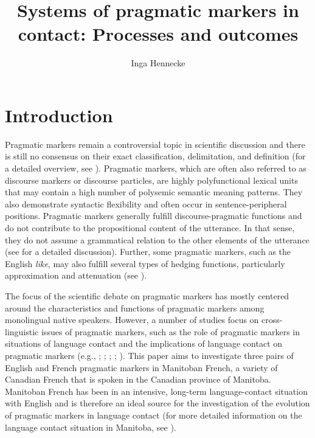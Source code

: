 \documentclass[output=paper]{langscibook}
\author{Inga Hennecke \orcid{0000-0002-9079-4849} \affiliation{University of Tübingen}}
\title[Systems of pragmatic markers in contact]{Systems of pragmatic markers in contact: Processes and outcomes}
\begin{document}
\maketitle

\section{Introduction}
Pragmatic markers remain a controversial topic in scientific discussion and there is still no consensus on their exact classification, delimitation, and definition (for a detailed overview, see \citealt{MosegaardHansen.1998, Andersen.2001,Aijmer.2002, Aijmer.2006}). Pragmatic markers, which are often also referred to as discourse markers or discourse particles, are highly polyfunctional lexical units that may contain a high number of polysemic semantic meaning patterns. They also demonstrate syntactic flexibility and often occur in sentence-peripheral positions. Pragmatic markers generally fulfill discourse-pragmatic functions and do not contribute to the propositional content of the utterance. In that sense, they do not assume a grammatical relation to the other elements of the utterance (see \citealt{Hennecke.2014} for a detailed discussion). Further, some pragmatic markers, such as the English \textit{like}, may also fulfill several types of hedging functions, particularly approximation and attenuation (see \citealt{Kaltenbock.2010}).

The focus of the scientific debate on pragmatic markers has mostly centered around the characteristics and functions of pragmatic markers among monolingual native speakers. However, a number of studies focus on cross-linguistic issues of pragmatic markers, such as the role of pragmatic markers in situations of language contact and the implications of language contact on pragmatic markers (e.g., \citealt{Mougeon.1991}; \citealt{Maschler.2000}; \citealt{Matras.2000}; \citealt{Hlavac.2006}; \citealt{Torres.2008}). This paper aims to investigate three pairs of English and French pragmatic markers in Manitoban French, a variety of Canadian French that is spoken in the Canadian province of Manitoba. Manitoban French has been in an intensive, long-term language-contact situation with English and is therefore an ideal source for the investigation of the evolution of pragmatic markers in language contact (for more detailed information on the language contact situation in Manitoba, see \cite{Hennecke.2014}).
\end{document}
